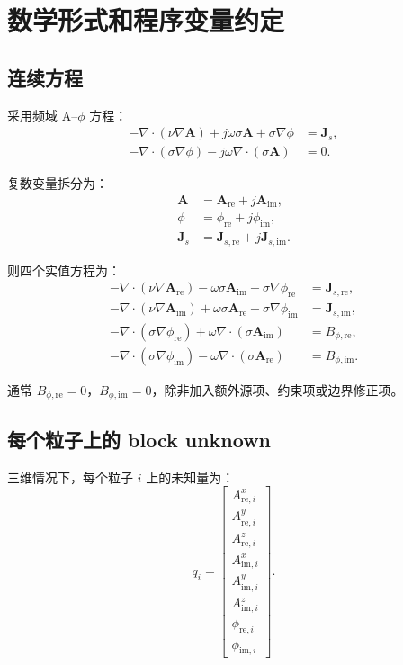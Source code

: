 \documentclass[UTF8,a4paper,11pt]{ctexart}
\newcommand{\Are}{\bm A_{\mathrm{re}}}
\newcommand{\Aim}{\bm A_{\mathrm{im}}}
\newcommand{\phire}{\phi_{\mathrm{re}}}
\newcommand{\phiim}{\phi_{\mathrm{im}}}
\begin{document}
\section{数学形式和程序变量约定}

\subsection{连续方程}

采用频域 A--$\phi$ 方程：
\begin{align}
-\nabla\cdot(\nu\nabla \bm A)
+j\omega\sigma\bm A
+\sigma\nabla\phi
&=\bm J_s, \\
-\nabla\cdot(\sigma\nabla\phi)
-j\omega\nabla\cdot(\sigma\bm A)
&=0.
\end{align}

复数变量拆分为：
\begin{align}
\bm A &= \Are+j\Aim, \\
\phi &= \phire+j\phiim, \\
\bm J_s &= \bm J_{s,\mathrm{re}}+j\bm J_{s,\mathrm{im}}.
\end{align}

则四个实值方程为：
\begin{align}
-\nabla\cdot(\nu\nabla \Are)
-\omega\sigma\Aim
+\sigma\nabla\phire
&=\bm J_{s,\mathrm{re}}, \\
-\nabla\cdot(\nu\nabla \Aim)
+\omega\sigma\Are
+\sigma\nabla\phiim
&=\bm J_{s,\mathrm{im}}, \\
-\nabla\cdot(\sigma\nabla\phire)
+\omega\nabla\cdot(\sigma\Aim)
&=B_{\phi,\mathrm{re}}, \\
-\nabla\cdot(\sigma\nabla\phiim)
-\omega\nabla\cdot(\sigma\Are)
&=B_{\phi,\mathrm{im}}.
\end{align}

通常 $B_{\phi,\mathrm{re}}=0$，$B_{\phi,\mathrm{im}}=0$，除非加入额外源项、约束项或边界修正项。

\subsection{每个粒子上的 block unknown}

三维情况下，每个粒子 $i$ 上的未知量为：
\begin{equation}
q_i=
\begin{bmatrix}
A^x_{\mathrm{re},i}\\
A^y_{\mathrm{re},i}\\
A^z_{\mathrm{re},i}\\
A^x_{\mathrm{im},i}\\
A^y_{\mathrm{im},i}\\
A^z_{\mathrm{im},i}\\
\phi_{\mathrm{re},i}\\
\phi_{\mathrm{im},i}
\end{bmatrix}.
\end{equation}
\end{document}
